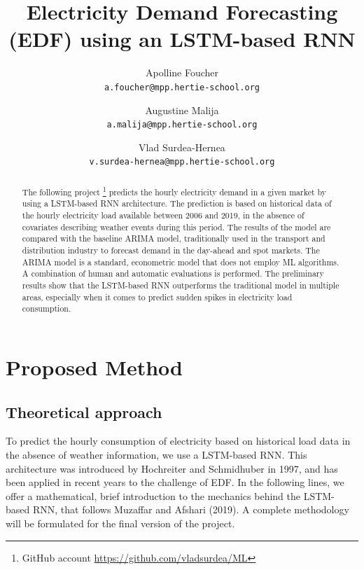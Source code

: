 \documentclass[10pt,twocolumn,letterpaper]{article}
\begin{document}
\title{Electricity Demand Forecasting (EDF) using an LSTM-based RNN}

\author{Apolline Foucher\\
{\tt\small a.foucher@mpp.hertie-school.org}
\and
Augustine Malija\\
{\tt\small a.malija@mpp.hertie-school.org}
\and
Vlad Surdea-Hernea\\
{\tt\small v.surdea-hernea@mpp.hertie-school.org}
}

\maketitle



\begin{abstract}
   The following project \footnote{GitHub account \url{https://github.com/vladsurdea/ML}} predicts the hourly electricity demand in a given market by using a LSTM-based RNN architecture. The prediction is based on historical data of the hourly electricity load available between 2006 and 2019, in the absence of covariates describing weather events during this period. The results of the model are compared with the baseline ARIMA model, traditionally used in the transport and distribution industry to forecast demand in the day-ahead and spot markets. The ARIMA model is a standard, econometric model that does not employ ML algorithms. A combination of human and automatic evaluations is performed. The preliminary results show that the LSTM-based RNN outperforms the traditional model in multiple areas, especially when it comes to predict sudden spikes in electricity load consumption.
\end{abstract}



\section{Proposed Method}

\subsection{Theoretical approach}

To predict the hourly consumption of electricity based on historical load data in the absence of weather information, we use a LSTM-based RNN. This architecture was introduced by Hochreiter and Schmidhuber in 1997, and has been applied in recent years to the challenge of EDF. In the following lines, we offer a mathematical, brief introduction to the mechanics behind the LSTM-based RNN, that follows Muzaffar and Afshari (2019). A complete methodology will be formulated for the final version of the project.
\end{document}
